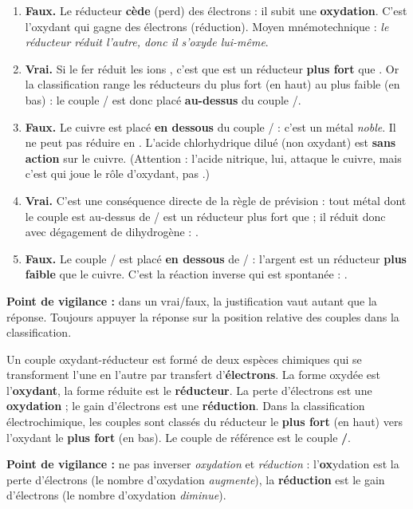 \documentclass[11pt]{article}
\begin{document}
\begin{corrige}
\begin{enumerate}
    \item \textbf{Faux.} Le réducteur \textbf{cède} (perd) des électrons : il subit une \textbf{oxydation}. C'est l'oxydant qui gagne des électrons (réduction). Moyen mnémotechnique : \emph{le réducteur réduit l'autre, donc il s'oxyde lui-même}.
    \item \textbf{Vrai.} Si le fer réduit les ions , c'est que  est un réducteur \textbf{plus fort} que . Or la classification range les réducteurs du plus fort (en haut) au plus faible (en bas) : le couple / est donc placé \textbf{au-dessus} du couple /.
    \item \textbf{Faux.} Le cuivre est placé \textbf{en dessous} du couple / : c'est un métal \emph{noble}. Il ne peut pas réduire  en . L'acide chlorhydrique dilué (non oxydant) est \textbf{sans action} sur le cuivre. (Attention : l'acide nitrique, lui, attaque le cuivre, mais c'est  qui joue le rôle d'oxydant, pas .)
    \item \textbf{Vrai.} C'est une conséquence directe de la règle de prévision : tout métal dont le couple est au-dessus de / est un réducteur plus fort que  ; il réduit donc  avec dégagement de dihydrogène : .
    \item \textbf{Faux.} Le couple / est placé \textbf{en dessous} de / : l'argent est un réducteur \textbf{plus faible} que le cuivre. C'est la réaction inverse qui est spontanée : .
\end{enumerate}
\textbf{Point de vigilance :} dans un vrai/faux, la justification vaut autant que la réponse. Toujours appuyer la réponse sur la position relative des couples dans la classification.
\end{corrige}

\begin{corrige}
Un couple oxydant-réducteur est formé de deux espèces chimiques qui se transforment l'une en l'autre par transfert d'\textbf{électrons}. La forme oxydée est l'\textbf{oxydant}, la forme réduite est le \textbf{réducteur}. La perte d'électrons est une \textbf{oxydation} ; le gain d'électrons est une \textbf{réduction}. Dans la classification électrochimique, les couples sont classés du réducteur le \textbf{plus fort} (en haut) vers l'oxydant le \textbf{plus fort} (en bas). Le couple de référence est le couple \textbf{/}.

\medskip
\textbf{Point de vigilance :} ne pas inverser \emph{oxydation} et \emph{réduction} : l'\textbf{ox}ydation est la perte d'électrons (le nombre d'oxydation \emph{augmente}), la \textbf{réduction} est le gain d'électrons (le nombre d'oxydation \emph{diminue}).
\end{corrige}
\end{document}
